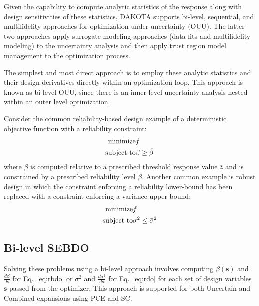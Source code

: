 Given the capability to compute analytic statistics of the response
along with design sensitivities of these statistics, DAKOTA supports
bi-level, sequential, and multifidelity approaches for optimization
under uncertainty (OUU). %
The latter two approaches apply surrogate modeling approaches (data 
fits and multifidelity modeling) to the uncertainty analysis and then 
apply trust region model management to the optimization process.

The simplest and most direct approach is to employ these analytic
statistics and their design derivatives directly within an
optimization loop.  This approach is known as bi-level OUU, since
there is an inner level uncertainty analysis nested within an outer
level optimization.

Consider the common reliability-based design example of a deterministic 
objective function with a reliability constraint:
\begin{eqnarray}
  {\rm minimize }     & f \nonumber \\
  {\rm subject \ to } & \beta \ge \bar{\beta} \label{eq:rbdo}
\end{eqnarray}
where $\beta$ is computed relative to a prescribed threshold response
value $\bar{z}$ and is constrained by a prescribed reliability level
$\bar{\beta}$.  Another common example is robust design in which the
constraint enforcing a reliability lower-bound has been replaced with
a constraint enforcing a variance upper-bound:
\begin{eqnarray}
  {\rm minimize }     & f \nonumber \\
  {\rm subject \ to } & \sigma^2 \le \bar{\sigma}^2 \label{eq:rdo}
\end{eqnarray}

\subsection{Bi-level SEBDO} \label{ouu:sebdo:bilev}

Solving these problems using a bi-level approach involves computing
$\beta(\boldsymbol{s})$ and $\frac{d\beta}{d\boldsymbol{s}}$ for
Eq.~\ref{eq:rbdo} or $\sigma^2$ and $\frac{d\sigma^2}{d\boldsymbol{s}}$
for Eq.~\ref{eq:rdo} for each set of design variables $\boldsymbol{s}$
passed from the optimizer.  This approach is supported for both 
Uncertain and Combined expansions using PCE and SC.

